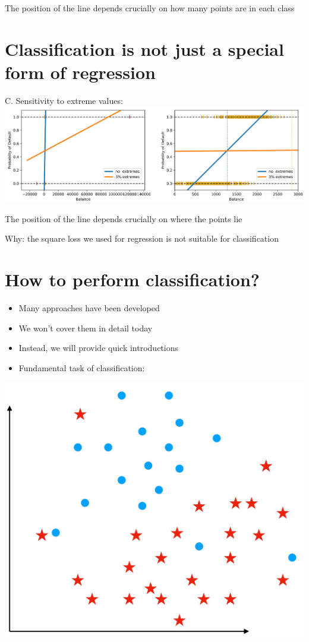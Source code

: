 \documentclass[10pt]{article}
\begin{document}
The position of the line depends crucially on how many points are in each class

\section*{Classification is not just a special form of regression}
C. Sensitivity to extreme values:
\includegraphics[max width=\textwidth, center]{2023_12_30_cf784c471dfd1dd5afbag-15}

The position of the line depends crucially on where the points lie

Why: the square loss we used for regression is not suitable for classification

\section*{How to perform classification?}
\begin{itemize}
  \item Many approaches have been developed

  \item We won't cover them in detail today

  \item Instead, we will provide quick introductions

  \item Fundamental task of classification:

\end{itemize}

\begin{center}
\includegraphics[max width=\textwidth]{2023_12_30_cf784c471dfd1dd5afbag-16}
\end{center}
\end{document}
